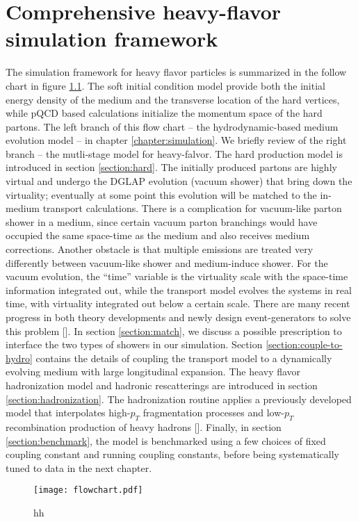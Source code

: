 \chapter{Comprehensive heavy-flavor simulation framework}
\label{chapter:coupling}

The simulation framework for heavy flavor particles is summarized in the follow chart in figure \ref{fig:flowchart}.
The soft initial condition model provide both the initial energy density of the medium and the transverse location of the hard vertices, while pQCD based calculations initialize the momentum space of the hard partons.
The left branch of this flow chart -- the hydrodynamic-based medium evolution model -- in chapter \ref{chapter:simulation}.
We briefly review of the right branch -- the mutli-stage model for heavy-falvor.
The hard production model is introduced in section \ref{section:hard}.
The initially produced partons are highly virtual and undergo the DGLAP evolution (vacuum shower) that bring down the virtuality; eventually at some point this evolution will be matched to the in-medium transport calculations.
There is a complication for vacuum-like parton shower in a medium, since  certain vacuum parton branchings would have occupied the same space-time as the medium and also receives medium corrections.
Another obstacle is that multiple emissions are treated very differently between vacuum-like shower and medium-induce shower.
For the vacuum evolution, the ``time'' variable is the virtuality scale with the space-time information integrated out, while the transport model evolves the systems in real time, with virtuality integrated out below a certain scale.
There are many recent progress in both theory developments and newly design event-generators to solve this problem [].
In section \ref{section:match}, we discuss a possible prescription to interface the two types of showers in our simulation.
Section \ref{section:couple-to-hydro} contains the details of coupling the transport model to a dynamically evolving medium with large longitudinal expansion.
The heavy flavor hadronization model and hadronic rescatterings are introduced in section \ref{section:hadronization}.
The hadronization routine applies a previously developed model that interpolates high-$p_T$ fragmentation processes and low-$p_T$ recombination production of heavy hadrons [].
Finally, in section \ref{section:benchmark}, the model is benchmarked using a few choices of fixed coupling constant and running coupling constants, before being systematically tuned to data in the next chapter.
\begin{figure}
\centering
\texttt{[image: flowchart.pdf]}
\caption{hh}
\label{fig:flowchart}
\end{figure}

